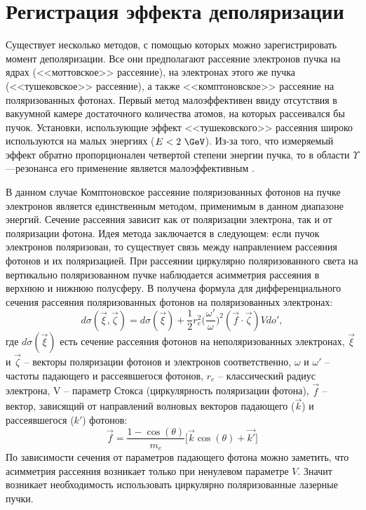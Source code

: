 \section{Регистрация эффекта деполяризации}
Существует несколько методов, с помощью которых можно зарегистрировать момент деполяризации. Все они предполагают рассеяние электронов пучка на ядрах (<<моттовское>> рассеяние), на электронах этого же пучка (<<тушековское>> рассеяние), а также <<комптоновское>> рассеяние на поляризованных фотонах. Первый метод малоэффективен ввиду отсутствия в вакуумной камере достаточного количества атомов, на которых рассеивался бы пучок. Установки, использующие эффект <<тушековского>> рассеяния широко используются на малых энергиях ($E < 2~\GeV$). Из-за того, что измеряемый эффект обратно пропорционален четвертой степени энергии пучка, то в области $\Upsilon$---резонанса его применение является малоэффективным \cite{nikitin-nikolaev}.
\par В данном случае Комптоновское рассеяние поляризованных фотонов на пучке электронов является единственным методом, применимым в данном диапазоне энергий. Сечение рассеяния зависит как от поляризации электрона, так и от поляризации фотона. Идея метода заключается в следующем: если пучок электронов поляризован, то существует связь между направлением рассеяния фотонов и их поляризацией. При рассеянии циркулярно поляризованного света на вертикально поляризованном пучке наблюдается асимметрия рассеяния в верхнюю и нижнюю полусферу. В \cite{landau_4} получена формула для дифференциального сечения рассеяния поляризованных фотонов на поляризованных электронах:
\begin{equation}
d \sigma(\vec{\xi}, \vec{\zeta}) = d\sigma(\vec{\xi}) + \frac{1}{2}r_e^2 \biggl(\frac{\omega'}{\omega}\biggr)^2 (\vec{f}\cdot \vec{\zeta})Vdo',
\label{eq:diff_cross_sec}
\end{equation}
где $d\sigma(\vec{\xi})$ есть сечение рассеяния фотонов на неполяризованных электронах, $\vec{\xi}$ и $\vec{\zeta}$ -- векторы поляризации фотонов и электронов соответственно, $\omega$ и $\omega'$ -- частоты падающего и рассеявшегося фотонов, $r_e$ -- классический радиус электрона, V -- параметр Стокса (циркулярность поляризации фотона), $\vec{f}$ -- вектор, зависящий от направлений волновых векторов падающего ($\vec{k}$) и рассеявшегося (${k'}$) фотонов: 
\begin{equation}
	\vec{f} = \frac{1 - \cos(\theta)}{m_e}\bigg[\vec{k} \cos(\theta) + \vec{k'}\bigg]
\end{equation}
 По зависимости сечения от параметров падающего фотона можно заметить, что асимметрия рассеяния возникает только при ненулевом параметре $V$. Значит возникает необходимость использовать циркулярно поляризованные лазерные пучки. 
